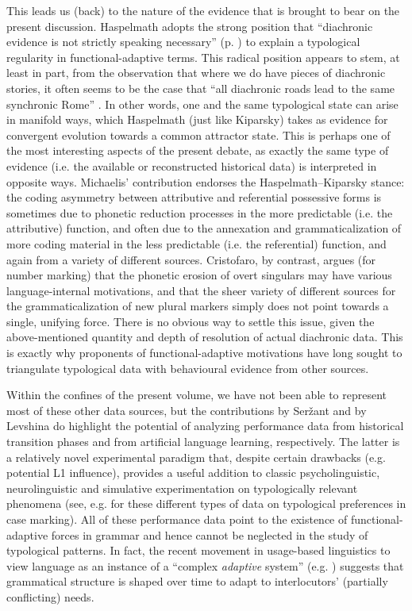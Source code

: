 \documentclass[output=paper]{langsci/langscibook}
\begin{document}
This leads us (back) to the nature of the evidence that is brought to bear on the present discussion. Haspelmath adopts the strong position that “diachronic evidence is not strictly speaking necessary” (p. \pageref{p:haspelmath:strictlyspeakingnecessary}) to explain a typological regularity in functional-adaptive terms. This radical position appears to stem, at least in part, from the observation that where we do have pieces of diachronic stories, it often seems to be the case that “all diachronic roads lead to the same synchronic Rome” \citep[38]{Kiparsky2008}. In other words, one and the same typological state can arise in manifold ways, which Haspelmath (just like Kiparsky) takes as evidence for convergent evolution towards a common attractor state. This is perhaps one of the most interesting aspects of the present debate, as exactly the same type of evidence (i.e. the available or reconstructed historical data) is interpreted in opposite ways. Michaelis’ contribution endorses the Haspelmath–Kiparsky stance: the coding asymmetry between attributive and referential possessive forms is sometimes due to phonetic reduction processes in the more predictable (i.e. the attributive) function, and often due to the annexation and grammaticalization of more coding material in the less predictable (i.e. the referential) function, and again from a variety of different sources. Cristofaro, by contrast, argues (for number marking) that the phonetic erosion of overt singulars may have various language-internal motivations, and that the sheer variety of different sources for the grammaticalization of new plural markers simply does not point towards a single, unifying force. There is no obvious way to settle this issue, given the above-mentioned quantity and depth of resolution of actual diachronic data. This is exactly why proponents of functional-adaptive motivations have long sought to triangulate typological data with behavioural evidence from other sources.

Within the confines of the present volume, we have not been able to represent most of these other data sources, but the contributions by Seržant and by Levshina do highlight the potential of analyzing performance data from historical transition phases and from artificial language learning, respectively. The latter is a relatively novel experimental paradigm that, despite certain drawbacks (e.g. potential L1 influence), provides a useful addition to classic psycholinguistic, neurolinguistic and simulative experimentation on typologically relevant phenomena (see, e.g. \citealt{KurumadaJaeger2015,BickelEtAl2015,Lestrade2018} for these different types of data on typological preferences in case marking). All of these performance data point to the existence of functional-adaptive forces in grammar and hence cannot be neglected in the study of typological patterns. In fact, the recent movement in usage-based linguistics to view language as an instance of a “complex \textit{adaptive} system” (e.g. \citealt{Gell-Mann1992,BecknerEtAl2009}) suggests that grammatical structure is shaped over time to adapt to interlocutors’ (partially conflicting) needs. 
\end{document}
